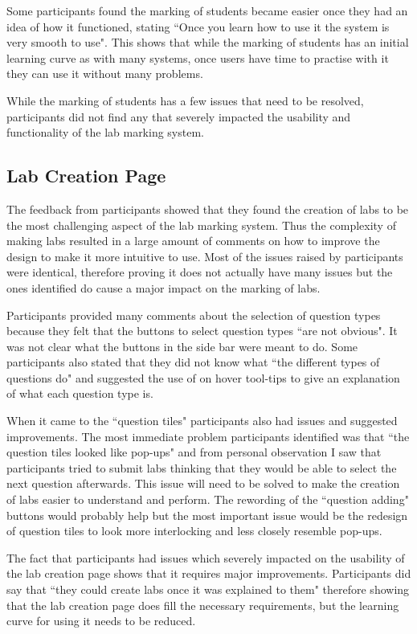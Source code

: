 \documentclass[11pt]{report}
\begin{document}
Some participants found the marking of students became easier once they had an idea of how it functioned, stating ``Once you learn how to use it the system is very smooth to use". This shows that while the marking of students has an initial learning curve as with many systems, once users have time to practise with it they can use it without many problems.

While the marking of students has a few issues that need to be resolved, participants did not find any that severely impacted the usability and functionality of the lab marking system.



\subsection*{Lab Creation Page}

The feedback from participants showed that they found the creation of labs to be the most challenging aspect of the lab marking system. Thus the complexity of making labs resulted in a large amount of comments on how to improve the design to make it more intuitive to use. Most of the issues raised by participants were identical, therefore proving it does not actually have many issues but the ones identified do cause a major impact on the marking of labs. 

Participants provided many comments about the selection of question types because they felt that the buttons to select question types ``are not obvious". It was not clear what the buttons in the side bar were meant to do. Some participants also stated that they did not know what ``the different types of questions do" and suggested the use of on hover tool-tips to give an explanation of what each question type is.

When it came to the ``question tiles" participants also had issues and suggested improvements. The most immediate problem participants identified was that ``the question tiles looked like pop-ups" and from personal observation I saw that participants tried to submit labs thinking that they would be able to select the next question afterwards. This issue will need to be solved to make the creation of labs easier to understand and perform. The rewording of the ``question adding" buttons would probably help but the most important issue would be the redesign of question tiles to look more interlocking and less closely resemble pop-ups.

The fact that participants had issues which severely impacted on the usability of the lab creation page shows that it requires major improvements. Participants did say that ``they could create labs once it was explained to them" therefore showing that the lab creation page does fill the necessary requirements, but the learning curve for using it needs to be reduced.
\end{document}

